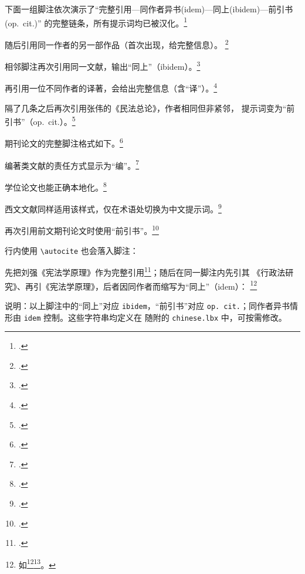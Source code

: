 下面一组脚注依次演示了“完整引用—同作者异书(idem)—同上(ibidem)—前引书(op.~cit.)”
的完整链条，所有提示词均已被汉化。\footcite[25]{zhang2010}

随后引用同一作者的另一部作品（首次出现，给完整信息）。%
\footcite{zhang2015}

相邻脚注再次引用同一文献，输出“同上”（ibidem）。\footcite[30]{zhang2015}

再引用一位不同作者的译著，会给出完整信息（含“译”）。\footcite{li2020}

隔了几条之后再次引用张伟的《民法总论》，作者相同但非紧邻，
提示词变为“前引书”（op.~cit.）。\footcite[12]{zhang2010}

期刊论文的完整脚注格式如下。\footcite{wang2019}

编著类文献的责任方式显示为“编”。\footcite{chen2018}

学位论文也能正确本地化。\footcite{zhao2021}

西文文献同样适用该样式，仅在术语处切换为中文提示词。\footcite[15]{smith2001}

再次引用前文期刊论文时使用“前引书”。\footcite[20]{wang2019}

行内使用 \verb|\autocite| 也会落入脚注：\autocite{zhang2010}

先把刘强《宪法学原理》作为完整引用\footcite{liu2010}；随后在同一脚注内先引其
《行政法研究》、再引《宪法学原理》，后者因同作者而缩写为“同上”（idem）：%
\footnote{如\footcite{liu2018}\footcite{liu2010}。}

\bigskip
\noindent 说明：以上脚注中的“同上”对应 \texttt{ibidem}，“前引书”对应
\texttt{op.~cit.}；同作者异书情形由 \texttt{idem} 控制。这些字符串均定义在
随附的 \texttt{chinese.lbx} 中，可按需修改。

\printbibliography


